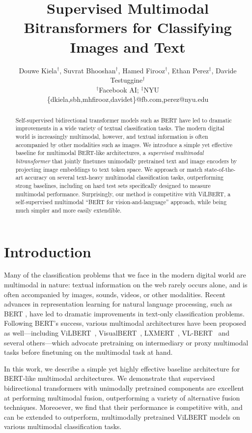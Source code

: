 \documentclass[11pt,a4paper]{article}
\title{Supervised Multimodal Bitransformers for Classifying Images and Text}
\author{Douwe Kiela$^\dagger$, Suvrat Bhooshan$^\dagger$, Hamed Firooz$^\dagger$, Ethan Perez$^\ddagger$, Davide Testuggine$^\dagger$\\
$^\dagger$Facebook AI; $^\ddagger$NYU\\
\{dkiela,sbh,mhfirooz,davidet\}@fb.com,perez@nyu.edu
}
\date{}
\begin{document}
\maketitle
\begin{abstract}
Self-supervised bidirectional transformer models such as BERT have led to dramatic improvements in a wide variety of textual classification tasks. The modern digital world is increasingly multimodal, however, and textual information is often accompanied by other modalities such as images. We introduce a simple yet effective baseline for multimodal BERT-like architectures, a \emph{supervised multimodal bitransformer} that jointly finetunes unimodally pretrained text and image encoders by projecting image embeddings to text token space. We approach or match state-of-the-art accuracy on several text-heavy multimodal classification tasks, outperforming strong baselines, including on hard test sets specifically designed to measure multimodal performance. Surprisingly, our method is competitive with ViLBERT, a self-supervised multimodal ``BERT for vision-and-language'' approach, while being much simpler and more easily extendible.
\end{abstract}

\section{Introduction}

Many of the classification problems that we face in the modern digital world are multimodal in nature: textual information on the web rarely occurs alone, and is often accompanied by images, sounds, videos, or other modalities. Recent advances in representation learning for natural language processing, such as BERT \cite{Devlin:2019naacl}, have led to dramatic improvements in text-only classification problems. Following BERT's success, various multimodal architectures have been proposed as well---including ViLBERT~\cite{Lu:2019vilbert}, VisualBERT~\cite{Li:2019visualbert}, LXMERT~\cite{Tan:2019lxmert}, VL-BERT~\cite{Su:2019vlbert} and several others---which advocate pretraining on intermediary or proxy multimodal tasks before finetuning on the multimodal task at hand.

In this work, we describe a simple yet highly effective baseline architecture for BERT-like multimodal architectures. We demonstrate that supervised bidirectional transformers with unimodally pretrained components are excellent at performing multimodal fusion, outperforming a variety of alternative fusion techniques. Moreoever, we find that their performance is competitive with, and can be extended to outperform, multimodally pretrained ViLBERT models on various multimodal classification tasks.
\end{document}
